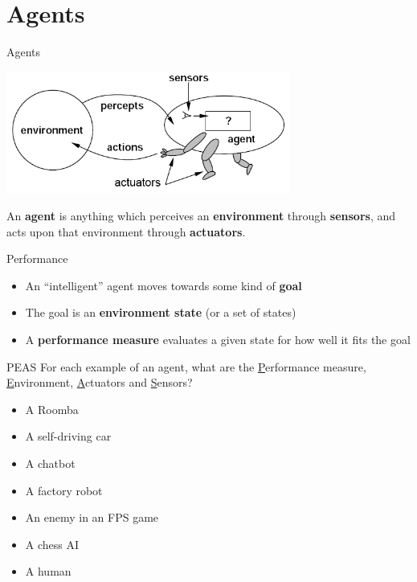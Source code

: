 \part{Agents}
\frame{\partpage}

\begin{frame}{Agents}
    \begin{center}
        \includegraphics[width=0.7\textwidth]{agent}

        \vspace{2ex}

        \pause An \textbf{agent} is anything which perceives an \textbf{environment} through \textbf{sensors},
            and acts upon that environment through \textbf{actuators}.
    \end{center}
\end{frame}

\begin{frame}{Performance}
    \begin{itemize}
        \pause\item An ``intelligent'' agent moves towards some kind of \textbf{goal}
        \pause\item The goal is an \textbf{environment state} (or a set of states)
        \pause\item A \textbf{performance measure} evaluates a given state for how well it fits the goal
    \end{itemize}
\end{frame}

\begin{frame}{PEAS}
    For each example of an agent, what are the \underline{P}erformance measure,
        \underline{E}nvironment, \underline{A}ctuators and \underline{S}ensors?
    
    \begin{itemize}
        \pause\item A Roomba
        \pause\item A self-driving car
        \pause\item A chatbot
        \pause\item A factory robot
        \pause\item An enemy in an FPS game
        \pause\item A chess AI
        \pause\item A human
    \end{itemize}
\end{frame}


